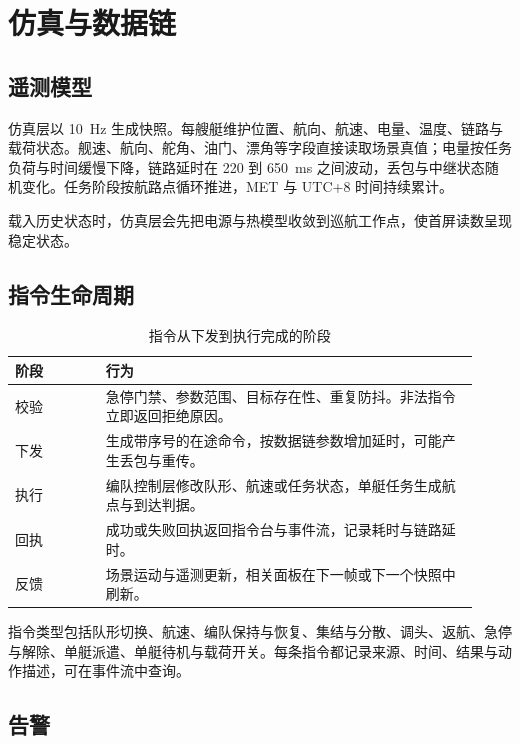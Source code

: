 \documentclass[UTF8, a4paper, 11pt]{ctexart}
\begin{document}
\section{仿真与数据链}

\subsection{遥测模型}

仿真层以 10~Hz 生成快照。每艘艇维护位置、航向、航速、电量、温度、链路与载荷状态。舰速、航向、舵角、油门、漂角等字段直接读取场景真值；电量按任务负荷与时间缓慢下降，链路延时在 220 到 650~ms 之间波动，丢包与中继状态随机变化。任务阶段按航路点循环推进，MET 与 UTC+8 时间持续累计。

载入历史状态时，仿真层会先把电源与热模型收敛到巡航工作点，使首屏读数呈现稳定状态。

\subsection{指令生命周期}

\begin{table}[H]
\centering
\caption{指令从下发到执行完成的阶段}
\label{tab:cmd-lifecycle}
\small
\begin{tabular}{@{}p{0.18\linewidth}p{0.74\linewidth}@{}}
\toprule
\textbf{阶段} & \textbf{行为} \\
\midrule
校验 & 急停门禁、参数范围、目标存在性、重复防抖。非法指令立即返回拒绝原因。 \\
下发 & 生成带序号的在途命令，按数据链参数增加延时，可能产生丢包与重传。 \\
执行 & 编队控制层修改队形、航速或任务状态，单艇任务生成航点与到达判据。 \\
回执 & 成功或失败回执返回指令台与事件流，记录耗时与链路延时。 \\
反馈 & 场景运动与遥测更新，相关面板在下一帧或下一个快照中刷新。 \\
\bottomrule
\end{tabular}
\end{table}

指令类型包括队形切换、航速、编队保持与恢复、集结与分散、调头、返航、急停与解除、单艇派遣、单艇待机与载荷开关。每条指令都记录来源、时间、结果与动作描述，可在事件流中查询。

\subsection{告警}
\end{document}
